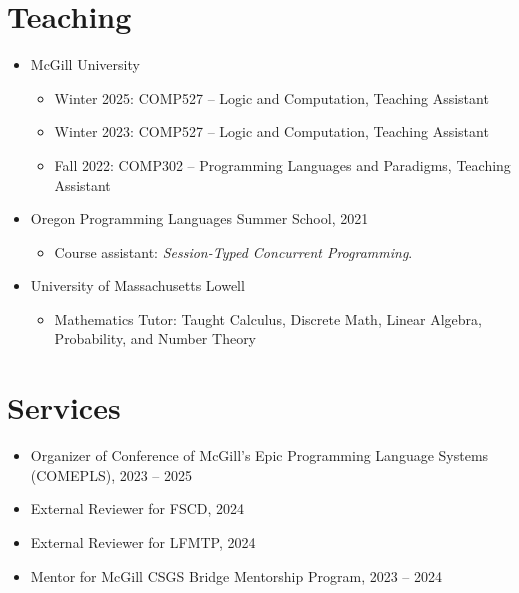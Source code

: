 \documentclass[11pt]{article}
\begin{document}
\section*{Teaching}
\begin{itemize}[leftmargin=*]
  \item McGill University
    \begin{itemize}
      \item Winter 2025: COMP527 – Logic and Computation, Teaching Assistant
      \item Winter 2023: COMP527 – Logic and Computation, Teaching Assistant
      \item Fall 2022: COMP302 – Programming Languages and Paradigms, Teaching Assistant
    \end{itemize}
  \item Oregon Programming Languages Summer School, 2021
    \begin{itemize}
      \item Course assistant: \emph{Session-Typed Concurrent Programming}.
    \end{itemize}

  \item University of Massachusetts Lowell
    \begin{itemize}
      \item Mathematics Tutor: Taught Calculus, Discrete Math, Linear Algebra, Probability, and Number Theory
    \end{itemize}
\end{itemize}

\section*{Services}
\begin{itemize}[leftmargin=*]
  \item Organizer of Conference of McGill's Epic Programming Language Systems (COMEPLS), 2023 -- 2025
  \item External Reviewer for FSCD, 2024
  \item External Reviewer for LFMTP, 2024
  \item Mentor for McGill CSGS Bridge Mentorship Program, 2023 -- 2024
\end{itemize}
\end{document}
